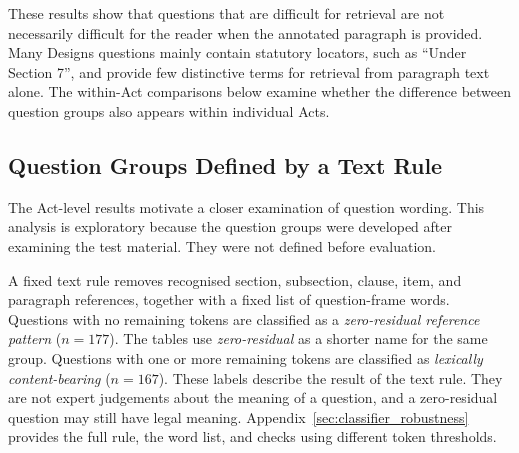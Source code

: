\documentclass[pdflatex,sn-basic]{sn-jnl}%
\theoremstyle{thmstyleone}%
\theoremstyle{thmstyletwo}%
\theoremstyle{thmstylethree}%
\begin{document}
These results show that questions that are difficult for retrieval are not
necessarily difficult for the reader when the annotated paragraph is
provided. Many Designs questions mainly contain statutory locators, such as
``Under Section 7'', and provide few distinctive terms for retrieval from
paragraph text alone. The within-Act comparisons below examine whether the
difference between question groups also appears within individual Acts.

\subsection{Question Groups Defined by a Text Rule}
\label{sec:citation_specified}

The Act-level results motivate a closer examination of question wording.
This analysis is exploratory because the question groups were developed after
examining the test material. They were not defined before evaluation.

A fixed text rule removes recognised section, subsection, clause, item, and
paragraph references, together with a fixed list of question-frame words.
Questions with no remaining tokens are classified as a
\emph{zero-residual reference pattern} ($n=177$). The tables use
\emph{zero-residual} as a shorter name for the same group. Questions with one
or more remaining tokens are classified as \emph{lexically content-bearing}
($n=167$). These labels describe the result of the text rule. They are not
expert judgements about the meaning of a question, and a zero-residual
question may still have legal meaning. Appendix~\ref{sec:classifier_robustness}
provides the full rule, the word list, and checks using different token
thresholds.
\end{document}
